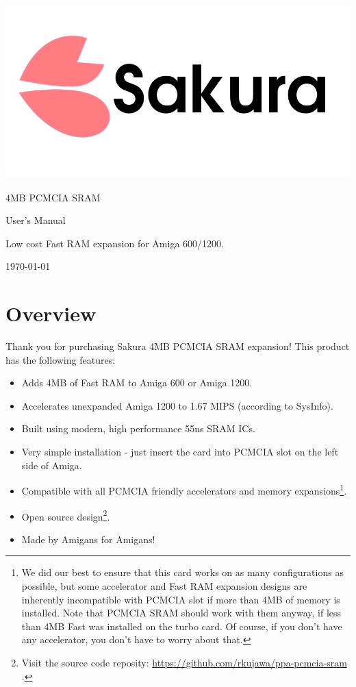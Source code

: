 \documentclass[10pt,a5paper]{article}
\begin{document}
\begin{titlepage}
\begin{center}

\includegraphics[scale=0.25]{sakuralogo.png}
\vfill

\huge
4MB PCMCIA SRAM

User's Manual

\vspace*{1cm}

\normalsize
Low cost Fast RAM expansion for Amiga 600/1200.

\vspace*{5cm}

\today

\end{center}
\end{titlepage}

\section*{Overview}

Thank you for purchasing Sakura 4MB PCMCIA SRAM expansion! This product has the following features:

\begin{itemize}
	\item Adds 4MB of Fast RAM to Amiga 600 or Amiga 1200.
	\item Accelerates unexpanded Amiga 1200 to 1.67 MIPS (according to SysInfo).
	\item Built using modern, high performance 55ns SRAM ICs.
	\item Very simple installation - just insert the card into PCMCIA slot on the left side of Amiga.
	\item Compatible with all PCMCIA friendly accelerators and memory expansions\footnote{We did our best to ensure that this card works on as many configurations as possible, but some accelerator and Fast RAM expansion designs are inherently incompatible with PCMCIA slot if more than 4MB of memory is installed. Note that PCMCIA SRAM should work with them anyway, if less than 4MB Fast was installed on the turbo card. Of course, if you don’t have any accelerator, you don’t have to worry about that.}.
	\item Open source design\footnote{Visit the source code reposity: \url{https://github.com/rkujawa/ppa-pcmcia-sram} .}.
	\item Made by Amigans for Amigans! 
\end{itemize}
\end{document}

